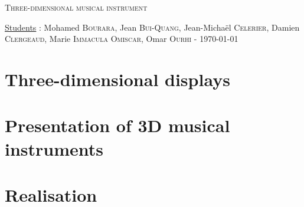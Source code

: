 \documentclass[a4paper,11pt,oneside]{report}
\begin{document}
\begin{titlepage}
  \begin{center}

    \textsc{\LARGE Three-dimensional musical instrument}\\[1cm]
    
  \end{center}
  
  \begin{flushbottom}
   \begin{flushleft}
    \underline{Students} : Mohamed \textsc{Bourara}, Jean \textsc{Bui-Quang}, Jean-Michaël \textsc{Celerier}, Damien \textsc{Clergeaud}, Marie \textsc{Immacula Omiscar}, Omar \textsc{Ourhi} - \today \\
   \end{flushleft}
  \end{flushbottom}
\end{titlepage}
\clearpage
\tableofcontents
\listoffigures




\chapter{Three-dimensional displays}
\label{chap:3ddisp}
\chapter{Presentation of 3D musical instruments}



\chapter{Realisation}





\printglossaries


\end{document}
